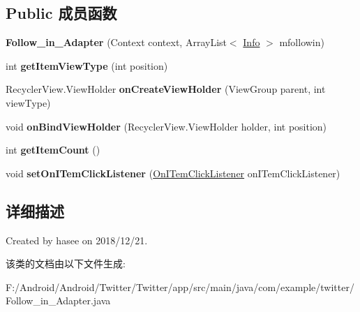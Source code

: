 \subsection*{Public 成员函数}
\begin{DoxyCompactItemize}
\item 
\mbox{\label{classcom_1_1example_1_1twitter_1_1_follow__in___adapter_af33f1c5153bca9afbdabf5337c871009}} 
{\bfseries Follow\+\_\+in\+\_\+\+Adapter} (Context context, Array\+List$<$ \mbox{\hyperlink{classcom_1_1example_1_1twitter_1_1_info}{Info}} $>$ mfollowin)
\item 
\mbox{\label{classcom_1_1example_1_1twitter_1_1_follow__in___adapter_afe3fcfbbea1d6642df118fbb15ae55e4}} 
int {\bfseries get\+Item\+View\+Type} (int position)
\item 
\mbox{\label{classcom_1_1example_1_1twitter_1_1_follow__in___adapter_af0f0423f941215ea50877b6a749c075f}} 
Recycler\+View.\+View\+Holder {\bfseries on\+Create\+View\+Holder} (View\+Group parent, int view\+Type)
\item 
\mbox{\label{classcom_1_1example_1_1twitter_1_1_follow__in___adapter_af4158604761b53400eb0d467bfcab14d}} 
void {\bfseries on\+Bind\+View\+Holder} (Recycler\+View.\+View\+Holder holder, int position)
\item 
\mbox{\label{classcom_1_1example_1_1twitter_1_1_follow__in___adapter_ab0feb33c398d954c3e95ebcb6f5523f2}} 
int {\bfseries get\+Item\+Count} ()
\item 
\mbox{\label{classcom_1_1example_1_1twitter_1_1_follow__in___adapter_a061a3b705f7eb9410d079e47982380fc}} 
void {\bfseries set\+On\+I\+Tem\+Click\+Listener} (\mbox{\hyperlink{interfacecom_1_1example_1_1twitter_1_1_follow__in___adapter_1_1_on_i_tem_click_listener}{On\+I\+Tem\+Click\+Listener}} on\+I\+Tem\+Click\+Listener)
\end{DoxyCompactItemize}


\subsection{详细描述}
Created by hasee on 2018/12/21. 

该类的文档由以下文件生成\+:\begin{DoxyCompactItemize}
\item 
F\+:/\+Android/\+Android/\+Twitter/\+Twitter/app/src/main/java/com/example/twitter/Follow\+\_\+in\+\_\+\+Adapter.\+java\end{DoxyCompactItemize}
